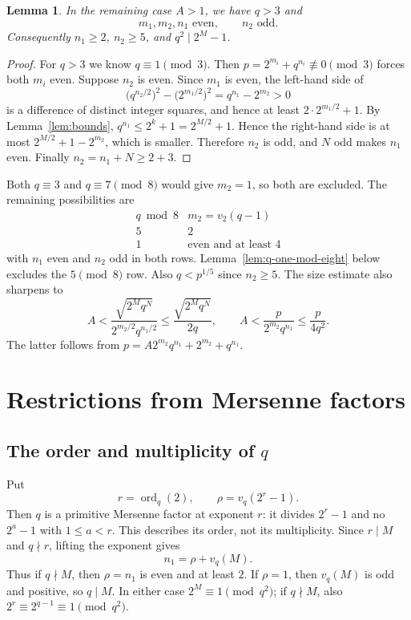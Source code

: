 \documentclass[11pt]{article}
\newtheorem{lemma}{Lemma}
\begin{document}
\begin{lemma}\label{lem:new-parities}
In the remaining case $A>1$, we have $q>3$ and
\[
m_1,m_2,n_1\text{ even},\qquad n_2\text{ odd}.
\]
Consequently $n_1\geq2$, $n_2\geq5$, and $q^2\mid2^M-1$.
\end{lemma}
\begin{proof}
For $q>3$ we know $q\equiv1\pmod3$. Then
$p=2^{m_i}+q^{n_i}\not\equiv0\pmod3$ forces both $m_i$ even.
Suppose $n_2$ is even. Since $m_1$ is even, the left-hand side of
\[
\bigl(q^{n_2/2}\bigr)^2-\bigl(2^{m_1/2}\bigr)^2
=q^{n_1}-2^{m_2}>0
\]
is a difference of distinct integer squares, and hence at least
$2\cdot2^{m_1/2}+1$. By Lemma~\ref{lem:bounds},
$q^{n_1}\leq2^k+1=2^{M/2}+1$. Hence the right-hand side is at most
$2^{M/2}+1-2^{m_2}$, which is smaller. Therefore $n_2$ is odd,
and $N$ odd makes $n_1$ even. Finally $n_2=n_1+N\geq2+3$.
\end{proof}

Both $q\equiv3$ and $q\equiv7\pmod8$ would give $m_2=1$, so both
are excluded. The remaining possibilities are
\[
\begin{array}{c|c}
q\bmod8&m_2=v_2(q-1)\\ \hline
5&2\\
1&\text{even and at least }4
\end{array}
\]
with $n_1$ even and $n_2$ odd in both rows.
Lemma~\ref{lem:q-one-mod-eight} below excludes the $5\pmod8$ row.
Also $q<p^{1/5}$ since $n_2\geq5$.
The size estimate also sharpens to
\begin{equation}\label{eq:sharp-A}
A<\frac{\sqrt{2^M q^N}}{2^{m_2/2}q^{n_1/2}}
\leq\frac{\sqrt{2^M q^N}}{2q},\qquad
A<\frac{p}{2^{m_2}q^{n_1}}\leq\frac{p}{4q^2}.
\end{equation}
The latter follows from $p=A2^{m_2}q^{n_1}+2^{m_2}+q^{n_1}$.


\section{Restrictions from Mersenne factors}
\label{sec:mersenne}

\subsection{\texorpdfstring{The order and multiplicity of $q$}{The order and multiplicity of q}}
Put
\[
r=\operatorname{ord}_q(2),\qquad \rho=v_q(2^r-1).
\]
Then $q$ is a primitive Mersenne factor at exponent $r$: it divides
$2^r-1$ and no $2^a-1$ with $1\leq a<r$.
This describes its order, not its multiplicity. Since $r\mid M$ and
$q\nmid r$, lifting the exponent gives
\begin{equation}\label{eq:exact-q-valuation}
\boxed{n_1=\rho+v_q(M).}
\end{equation}
Thus if $q\nmid M$, then $\rho=n_1$ is even and at least $2$.
If $\rho=1$, then $v_q(M)$ is odd and positive, so $q\mid M$.
In either case $2^M\equiv1\pmod{q^2}$; if $q\nmid M$, also
$2^r\equiv2^{q-1}\equiv1\pmod{q^2}$.
\end{document}
